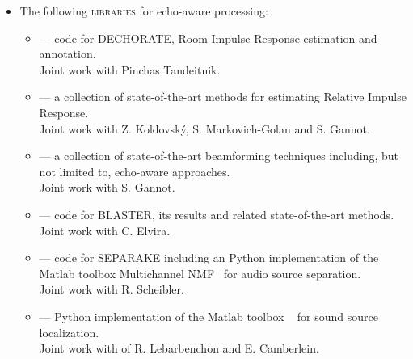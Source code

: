 \begin{itemize}
    \item The following \textsc{libraries} for echo-aware processing:
    \begin{itemize}[label={\scriptsize\faCode}]
        \item {} --- code for \acs{DECHORATE}, Room Impulse Response estimation and annotation.
        \\{\small Joint work with Pinchas Tandeitnik.}
        \item {} --- a collection of state-of-the-art methods for estimating Relative Impulse Response.
        \\{\small Joint work with Z. Koldovsk\'{y}, S. Markovich-Golan and S. Gannot.}
        \item {} --- a collection of state-of-the-art beamforming techniques including, but not limited to, echo-aware approaches.
        \\{\small Joint work with S. Gannot.}
        \item {} --- code for \acs{BLASTER}, its results and related state-of-the-art methods.
        \\{\small Joint work with C. Elvira.}
        \item {} --- code for \acs{SEPARAKE} including an Python implementation of the Matlab toolbox Multichannel NMF~ for audio source separation.
        \\{\small Joint work with R. Scheibler.}
        \item {} --- Python implementation of the Matlab toolbox \href{http://bass-db.gforge.inria.fr/bss_locate/}{}~ for sound source localization.
        \\{\small Joint work with of R. Lebarbenchon and E. Camberlein.}

    \end{itemize}

\end{itemize}


